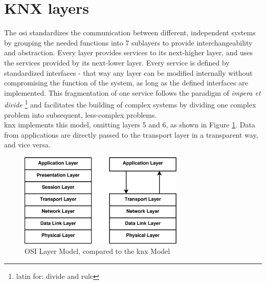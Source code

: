 \section{KNX layers}\label{sec:knxLayers}

The \gls{osi} standardizes the communication between different, independent systems
by grouping the needed functions into 7 sublayers to provide interchangeability and abstraction. Every layer provides services to its next-higher layer, and
uses the services provided by its next-lower layer. Every service is defined by standardized interfaces - that way any layer can be modified internally without
compromising the function of the system, as long as the defined interfaces are implemented. This fragmentation of one service follows the paradigm of 
\textit{impera et divide} \footnote{latin for: divide and rule} and facilitates the building of complex systems by dividing one complex problem into subsequent,
less-complex problems.
\\
\gls{knx} implements this model, omitting 
layers 5 and 6, as shown in Figure \ref{fig:knxlayers}. Data from applications are directly passed to the transport layer in a transparent way, and vice versa.
\begin{figure}
    \centering
     \includegraphics[width=0.7\textwidth]{figures/isoOSI.eps}

    \caption{OSI Layer Model, compared to the \gls{knx} Model}
    \label{fig:knxlayers}
\end{figure}

